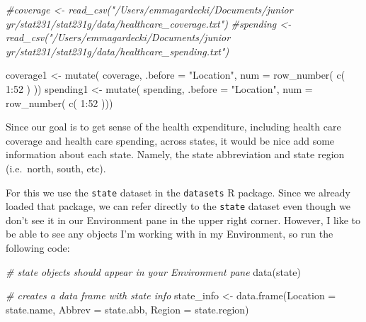 \documentclass[
]{article}
\newenvironment{Shaded}{\begin{snugshade}}{\end{snugshade}}
\newcommand{\AttributeTok}[1]{\textcolor[rgb]{0.77,0.63,0.00}{#1}}
\newcommand{\CommentTok}[1]{\textcolor[rgb]{0.56,0.35,0.01}{\textit{#1}}}
\newcommand{\DecValTok}[1]{\textcolor[rgb]{0.00,0.00,0.81}{#1}}
\newcommand{\FunctionTok}[1]{\textcolor[rgb]{0.00,0.00,0.00}{#1}}
\newcommand{\NormalTok}[1]{#1}
\newcommand{\OtherTok}[1]{\textcolor[rgb]{0.56,0.35,0.01}{#1}}
\newcommand{\SpecialCharTok}[1]{\textcolor[rgb]{0.00,0.00,0.00}{#1}}
\newcommand{\StringTok}[1]{\textcolor[rgb]{0.31,0.60,0.02}{#1}}
\begin{document}
\begin{Shaded}
\begin{Highlighting}[]
\CommentTok{\#coverage \textless{}{-} read\_csv("/Users/emmagardecki/Documents/junior yr/stat231/stat231g/data/healthcare\_coverage.txt")}
\CommentTok{\#spending \textless{}{-} read\_csv("/Users/emmagardecki/Documents/junior yr/stat231/stat231g/data/healthcare\_spending.txt")}
\end{Highlighting}
\end{Shaded}

\begin{Shaded}
\begin{Highlighting}[]
\NormalTok{coverage1 }\OtherTok{\textless{}{-}} \FunctionTok{mutate}\NormalTok{( coverage, }\AttributeTok{.before =} \StringTok{"Location"}\NormalTok{, }\AttributeTok{num =} \FunctionTok{row\_number}\NormalTok{(  }\FunctionTok{c}\NormalTok{( }\DecValTok{1}\SpecialCharTok{:}\DecValTok{52}\NormalTok{ ) )) }
\NormalTok{spending1 }\OtherTok{\textless{}{-}} \FunctionTok{mutate}\NormalTok{( spending, }\AttributeTok{.before =} \StringTok{"Location"}\NormalTok{, }\AttributeTok{num =} \FunctionTok{row\_number}\NormalTok{( }\FunctionTok{c}\NormalTok{( }\DecValTok{1}\SpecialCharTok{:}\DecValTok{52}\NormalTok{ )))}
\end{Highlighting}
\end{Shaded}

Since our goal is to get sense of the health expenditure, including
health care coverage and health care spending, across states, it would
be nice add some information about each state. Namely, the state
abbreviation and state region (i.e.~north, south, etc).

For this we use the \texttt{state} dataset in the \texttt{datasets} R
package. Since we already loaded that package, we can refer directly to
the \texttt{state} dataset even though we don't see it in our
Environment pane in the upper right corner. However, I like to be able
to see any objects I'm working with in my Environment, so run the
following code:

\begin{Shaded}
\begin{Highlighting}[]
\CommentTok{\# state objects should appear in your Environment pane}
\FunctionTok{data}\NormalTok{(state) }

\CommentTok{\# creates a data frame with state info}
\NormalTok{state\_info }\OtherTok{\textless{}{-}} \FunctionTok{data.frame}\NormalTok{(}\AttributeTok{Location =}\NormalTok{ state.name, }\AttributeTok{Abbrev =}\NormalTok{ state.abb, }\AttributeTok{Region =}\NormalTok{ state.region)}
\end{Highlighting}
\end{Shaded}
\end{document}

